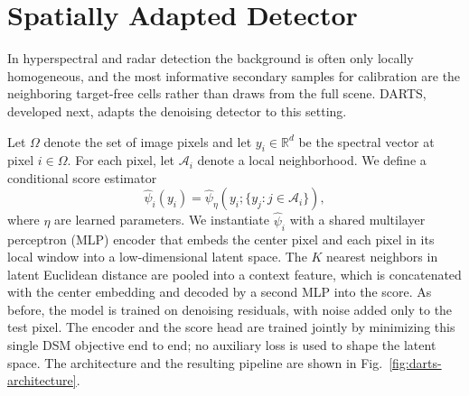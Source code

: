 \chapter{Spatially Adapted Detector}
\label{sec:spatial_score_matching}

In hyperspectral and radar detection the background is often only locally
homogeneous, and the most informative secondary samples for calibration are
the neighboring target-free cells rather than draws from the full scene.
DARTS, developed next, adapts the denoising detector to this setting.

Let $\Omega$ denote the set of image pixels and let $y_i \in \mathbb{R}^d$ be the
spectral vector at pixel $i \in \Omega$. For each pixel, let
$\mathcal{A}_i$ denote a local neighborhood. We define a conditional score
estimator
\begin{equation}
\widehat{\psi}_i(y_i)
=
\widehat{\psi}_{\eta}
\left(
y_i;\{y_j : j \in \mathcal{A}_i\}
\right),
\label{eq:local_score_estimator}
\end{equation}
where $\eta$ are learned parameters. We instantiate $\widehat{\psi}_i$ with a
shared multilayer perceptron (MLP) encoder that embeds the center pixel and each pixel in its local
window into a low-dimensional latent space. The $K$ nearest neighbors in latent
Euclidean distance are pooled into a context feature, which is concatenated with
the center embedding and decoded by a second MLP into the score. As before, the
model is trained on denoising residuals, with noise added only to the test
pixel. The encoder and the score head are trained jointly by minimizing this
single DSM objective end to end; no auxiliary loss is used to shape the latent
space. The architecture and the resulting pipeline are shown in Fig.~\ref{fig:darts-architecture}.



